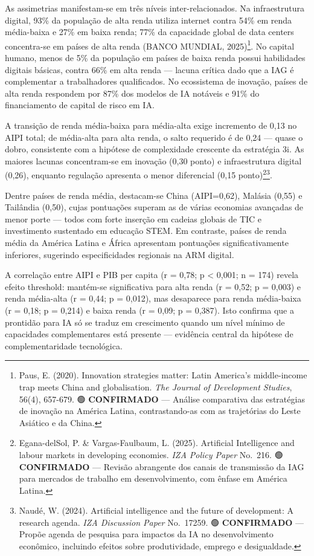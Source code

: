 \documentclass[
  brazilian,
  12pt,
]{article}
\begin{document}
As assimetrias manifestam-se em três níveis inter-relacionados. Na infraestrutura digital, 93\% da população de alta renda utiliza internet contra 54\% em renda média-baixa e 27\% em baixa renda; 77\% da capacidade global de data centers concentra-se em países de alta renda (BANCO MUNDIAL, 2025)\footnote{Paus, E. (2020). Innovation strategies matter: Latin America's middle-income trap meets China and globalisation. \emph{The Journal of Development Studies}, 56(4), 657-679. 🟢 \textbf{CONFIRMADO} --- Análise comparativa das estratégias de inovação na América Latina, contrastando-as com as trajetórias do Leste Asiático e da China.}. No capital humano, menos de 5\% da população em países de baixa renda possui habilidades digitais básicas, contra 66\% em alta renda --- lacuna crítica dado que a IAG é complementar a trabalhadores qualificados. No ecossistema de inovação, países de alta renda respondem por 87\% dos modelos de IA notáveis e 91\% do financiamento de capital de risco em IA.

A transição de renda média-baixa para média-alta exige incremento de 0,13 no AIPI total; de média-alta para alta renda, o salto requerido é de 0,24 --- quase o dobro, consistente com a hipótese de complexidade crescente da estratégia 3i. As maiores lacunas concentram-se em inovação (0,30 ponto) e infraestrutura digital (0,26), enquanto regulação apresenta o menor diferencial (0,15 ponto)\footnote{Egana-delSol, P. \& Vargas-Faulbaum, L. (2025). Artificial Intelligence and labour markets in developing economies. \emph{IZA Policy Paper} No.~216. 🟢 \textbf{CONFIRMADO} --- Revisão abrangente dos canais de transmissão da IAG para mercados de trabalho em desenvolvimento, com ênfase em América Latina.}\footnote{Naudé, W. (2024). Artificial intelligence and the future of development: A research agenda. \emph{IZA Discussion Paper} No.~17259. 🟢 \textbf{CONFIRMADO} --- Propõe agenda de pesquisa para impactos da IA no desenvolvimento econômico, incluindo efeitos sobre produtividade, emprego e desigualdade.}.

Dentre países de renda média, destacam-se China (AIPI=0,62), Malásia (0,55) e Tailândia (0,50), cujas pontuações superam as de várias economias avançadas de menor porte --- todos com forte inserção em cadeias globais de TIC e investimento sustentado em educação STEM. Em contraste, países de renda média da América Latina e África apresentam pontuações significativamente inferiores, sugerindo especificidades regionais na ARM digital.

A correlação entre AIPI e PIB per capita (r = 0,78; p \textless{} 0,001; n = 174) revela efeito threshold: mantém-se significativa para alta renda (r = 0,52; p = 0,003) e renda média-alta (r = 0,44; p = 0,012), mas desaparece para renda média-baixa (r = 0,18; p = 0,214) e baixa renda (r = 0,09; p = 0,387). Isto confirma que a prontidão para IA só se traduz em crescimento quando um nível mínimo de capacidades complementares está presente --- evidência central da hipótese de complementaridade tecnológica.
\end{document}

